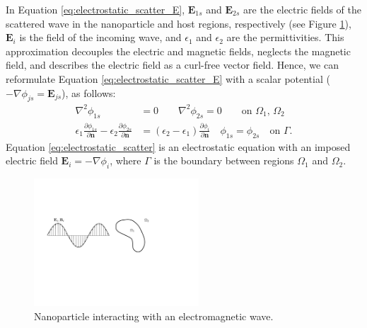 In Equation \eqref{eq:electrostatic_scatter_E}, $\mathbf{E}_{1s}$ and $\mathbf{E}_{2s}$ 
are the electric fields of the scattered wave in the nanoparticle and host regions, respectively 
(see Figure \ref{fig:part_wave}), 
$\mathbf{E}_{i}$ is the field of the incoming wave, and $\epsilon_1$ 
and $\epsilon_2$ are the permittivities.
This approximation decouples the electric and magnetic fields, neglects the magnetic field, 
and describes the electric field as a curl-free vector field.
Hence, we can reformulate Equation \eqref{eq:electrostatic_scatter_E} with a scalar potential
($-\nabla \phi_{js} = \mathbf{E}_{js}$), as follows:
%
\begin{align} \label{eq:electrostatic_scatter}
\nabla^2 \phi_{1s} &= 0 \qquad \nabla^2 \phi_{2s} = 0 \qquad\text{on $\Omega_1$, $\Omega_2$} \nonumber \\
\epsilon_1\frac{\partial\phi_{1s}}{\partial \mathbf{n}} - \epsilon_2\frac{\partial\phi_{2s}}{\partial\mathbf{n}} &= (\epsilon_2-\epsilon_1)\frac{\partial\phi_i}{\partial\mathbf{n}} \quad \phi_{1s} = \phi_{2s} \quad \text{on $\Gamma$}.
\end{align}
%
Equation \eqref{eq:electrostatic_scatter} is an electrostatic equation 
with an imposed electric field $\mathbf{E}_i=-\nabla\phi_i$, where $\Gamma$ 
is the boundary between regions $\Omega_1$ and $\Omega_2$.

\begin{figure}%
   \centering
   \includegraphics[width=0.55\textwidth]{particle_wave.pdf} 
   \caption{Nanoparticle interacting with an electromagnetic wave.}
   \label{fig:part_wave}
\end{figure}


